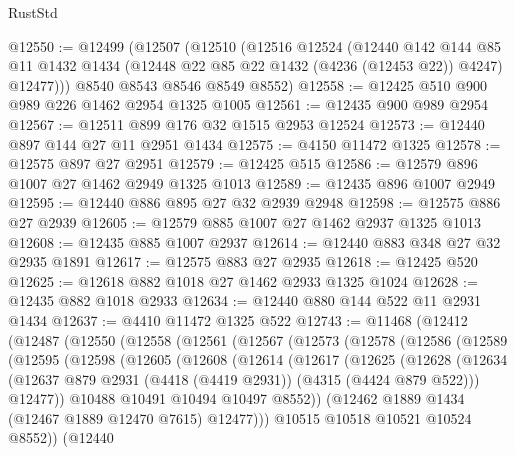 \begin{lexlean}{RustStd}
\begin{coremodule}
@12550 := @12499
    (@12507
      (@12510
        (@12516
          @12524
          (@12440
            @142
            @144
            @85
            @11
            @1432
            @1434
            (@12448 @22 @85 @22 @1432 (@4236 (@12453 @22)) @4247)
            @12477)))
      @8540
      @8543
      @8546
      @8549
      @8552)
@12558 := @12425 @510 @900 @989 @226 @1462 @2954 @1325 @1005
@12561 := @12435 @900 @989 @2954
@12567 := @12511 @899 @176 @32 @1515 @2953 @12524
@12573 := @12440 @897 @144 @27 @11 @2951 @1434
@12575 := @4150 @11472 @1325
@12578 := @12575 @897 @27 @2951
@12579 := @12425 @515
@12586 := @12579 @896 @1007 @27 @1462 @2949 @1325 @1013
@12589 := @12435 @896 @1007 @2949
@12595 := @12440 @886 @895 @27 @32 @2939 @2948
@12598 := @12575 @886 @27 @2939
@12605 := @12579 @885 @1007 @27 @1462 @2937 @1325 @1013
@12608 := @12435 @885 @1007 @2937
@12614 := @12440 @883 @348 @27 @32 @2935 @1891
@12617 := @12575 @883 @27 @2935
@12618 := @12425 @520
@12625 := @12618 @882 @1018 @27 @1462 @2933 @1325 @1024
@12628 := @12435 @882 @1018 @2933
@12634 := @12440 @880 @144 @522 @11 @2931 @1434
@12637 := @4410 @11472 @1325 @522
@12743 := @11468
    (@12412
      (@12487
        (@12550
          (@12558
            (@12561
              (@12567
                (@12573
                  (@12578
                    (@12586
                      (@12589
                        (@12595
                          (@12598
                            (@12605
                              (@12608
                                (@12614
                                  (@12617
                                    (@12625
                                      (@12628
                                        (@12634
                                          (@12637
                                            @879
                                            @2931
                                            (@4418 (@4419 @2931))
                                            (@4315 (@4424 @879 @522)))
                                          @12477))
                                      @10488
                                      @10491
                                      @10494
                                      @10497
                                      @8552))
                                  (@12462 @1889 @1434 (@12467 @1889 @12470 @7615) @12477)))
                              @10515
                              @10518
                              @10521
                              @10524
                              @8552))
                          (@12440

\end{coremodule}
\end{lexlean}
